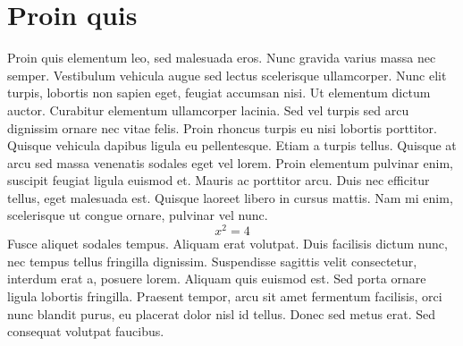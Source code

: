 \section{Proin quis}\markdownRendererInterblockSeparator
{}Proin quis elementum leo, sed malesuada eros. Nunc gravida varius massa nec semper. Vestibulum vehicula augue sed lectus scelerisque ullamcorper. Nunc elit turpis, lobortis non sapien eget, feugiat accumsan nisi. Ut elementum dictum auctor. Curabitur elementum ullamcorper lacinia. Sed vel turpis sed arcu dignissim ornare nec vitae felis. Proin rhoncus turpis eu nisi lobortis porttitor. Quisque vehicula dapibus ligula eu pellentesque. Etiam a turpis tellus. Quisque at arcu sed massa venenatis sodales eget vel lorem. Proin elementum pulvinar enim, suscipit feugiat ligula euismod et. Mauris ac porttitor arcu. Duis nec efficitur tellus, eget malesuada est. Quisque laoreet libero in cursus mattis. Nam mi enim, scelerisque ut congue ornare, pulvinar vel nunc.\markdownRendererInterblockSeparator
{}$$x^2 = 4$$\markdownRendererInterblockSeparator
{}Fusce aliquet sodales tempus. Aliquam erat volutpat. Duis facilisis dictum nunc, nec tempus tellus fringilla dignissim. Suspendisse sagittis velit consectetur, interdum erat a, posuere lorem. Aliquam quis euismod est. Sed porta ornare ligula lobortis fringilla. Praesent tempor, arcu sit amet fermentum facilisis, orci nunc blandit purus, eu placerat dolor nisl id tellus. Donec sed metus erat. Sed consequat volutpat faucibus. \relax